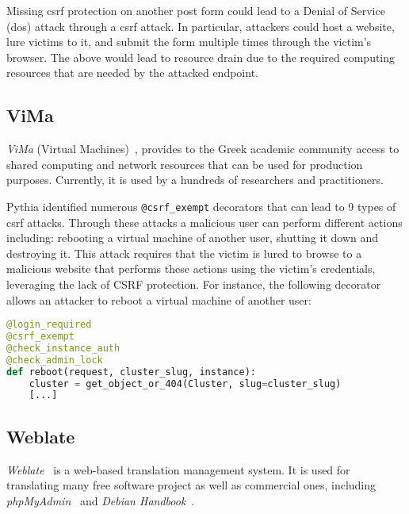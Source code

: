 Missing {\sc csrf} protection on
another {\sc post} form could lead to
a Denial of Service ({\sc d}o{\sc s})
attack through a {\sc csrf} attack.
In particular,
attackers could host a website,
lure victims to it,
and submit the form multiple times
through the victim's browser.
The above would lead to resource drain
due to the required computing resources
that are needed by the attacked endpoint.

\subsection{ViMa}
\label{sec:vima}

{\it ViMa} (Virtual Machines)~\cite{vima},
provides to the Greek academic community
access to shared computing and network resources that can be used
for production purposes.
Currently,
it is used by a hundreds of researchers
and practitioners.

Pythia identified numerous
{\tt @csrf\_exempt} decorators
that can lead to 9 types of
{\sc csrf} attacks.
Through these attacks a malicious
user can perform different actions including:
rebooting a virtual machine of another user,
shutting it down and destroying it. This attack
requires that the victim is lured to browse to a malicious
website that performs these actions using the
victim's credentials, leveraging the lack of
CSRF protection.
For instance,
the following decorator
allows an attacker to reboot
a virtual machine of another user:

\vspace{0.8mm}
\begin{lstlisting}[language=Python, basicstyle=\footnotesize\ttfamily]
@login_required
@csrf_exempt
@check_instance_auth
@check_admin_lock
def reboot(request, cluster_slug, instance):
    cluster = get_object_or_404(Cluster, slug=cluster_slug)
    [...]
\end{lstlisting}
\vspace{0.8mm}

\subsection{Weblate}
\label{sec:weblate}
\begin{comment}
https://github.com/WeblateOrg/weblate/blob/d84dfdbdfaba0d31588fd3bc9253e6d75d03e644/weblate/trans/views/basic.py#L91-L129
\end{comment}
{\it Weblate}~\cite{weblate} is a web-based
translation management system.
It is  used for translating many free
software project as well as commercial ones,
including
{\it phpMyAdmin}~\cite{phpma} and
{\it Debian Handbook}~\cite{dhbk}.

